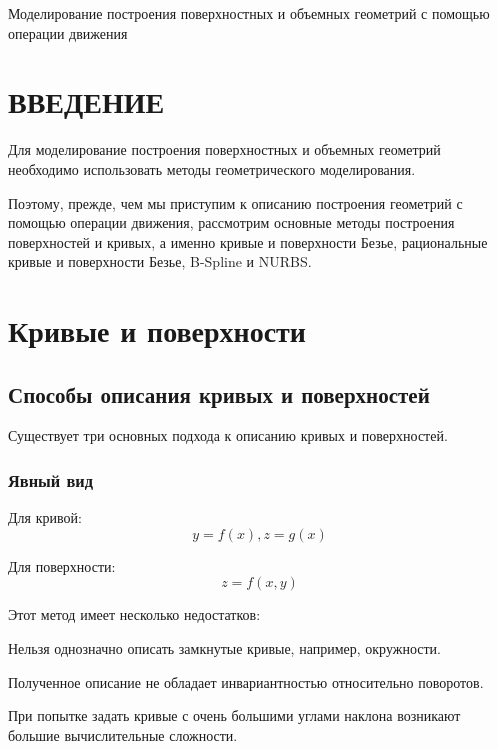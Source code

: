 \documentclass{bmstu}
\newenvironment{gost-itemize}
{\begin{itemize}[label=---,itemindent=\parindent,leftmargin=0pt]}
	{\end{itemize}}
\begin{document}
\makecourseworktitle
{} %
{} %
{Моделирование построения поверхностных и объемных геометрий с помощью операции движения} %
{} %
{} %
{} %

\maketableofcontents

\chapter*{ВВЕДЕНИЕ}
Для моделирование построения поверхностных и объемных геометрий необходимо использовать методы геометрического моделирования.

Поэтому, прежде, чем мы приступим к описанию построения геометрий с помощью операции движения, рассмотрим основные методы построения поверхностей и кривых, а именно  кривые и поверхности Безье, рациональные кривые и поверхности Безье, B-Spline и NURBS.


\chapter{Кривые и поверхности}
\section{Способы описания кривых и поверхностей}
Существует три основных подхода к описанию кривых и поверхностей.
\subsection{Явный вид}

Для кривой:
\begin{equation*}
    y=f(x), z = g(x)
\end{equation*}

Для поверхности:
\begin{equation*}
    z = f(x, y)
\end{equation*}

Этот метод имеет несколько недостатков:
\begin{gost-itemize}
    \item Нельзя однозначно описать замкнутые кривые, например, окружности.
    \item Полученное описание не обладает инвариантностью относительно поворотов.
    \item При попытке задать кривые с очень большими углами наклона возникают большие вычислительные сложности.
\end{gost-itemize}
\end{document}

